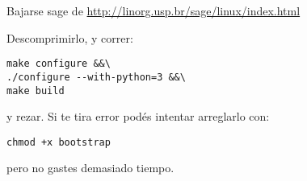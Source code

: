\documentclass[10pt,a4paper]{report}
\begin{document}
\begin{itemize}
Bajarse sage de \url{http://linorg.usp.br/sage/linux/index.html}

Descomprimirlo, y correr:

\begin{lstlisting}
make configure &&\
./configure --with-python=3 &&\
make build
\end{lstlisting}

y rezar. Si te tira error  podés intentar arreglarlo con:

\begin{lstlisting}
chmod +x bootstrap
\end{lstlisting}

pero no gastes demasiado tiempo.

\end{itemize}
\end{document}
